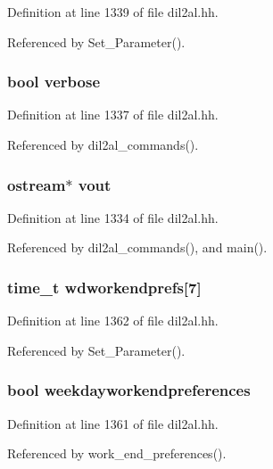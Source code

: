 Definition at line 1339 of file dil2al.hh.

Referenced by Set\_\-Parameter().
\subsubsection{\setlength{\rightskip}{0pt plus 5cm}bool verbose}\label{dil2al_8hh_a135}




Definition at line 1337 of file dil2al.hh.

Referenced by dil2al\_\-commands().
\subsubsection{\setlength{\rightskip}{0pt plus 5cm}ostream$\ast$ vout}\label{dil2al_8hh_a132}




Definition at line 1334 of file dil2al.hh.

Referenced by dil2al\_\-commands(), and main().
\subsubsection{\setlength{\rightskip}{0pt plus 5cm}time\_\-t wdworkendprefs[7]}\label{dil2al_8hh_a168}




Definition at line 1362 of file dil2al.hh.

Referenced by Set\_\-Parameter().
\subsubsection{\setlength{\rightskip}{0pt plus 5cm}bool weekdayworkendpreferences}\label{dil2al_8hh_a167}




Definition at line 1361 of file dil2al.hh.

Referenced by work\_\-end\_\-preferences().